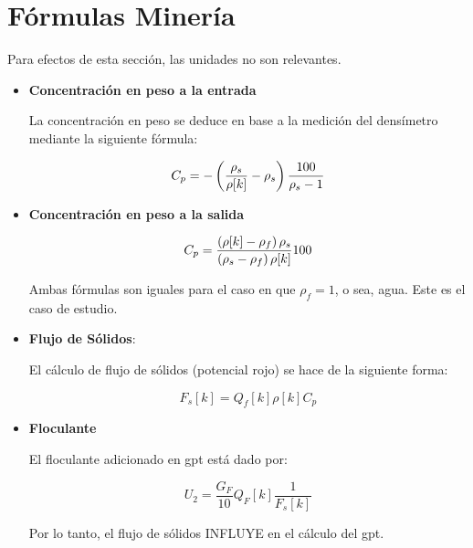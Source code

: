 \documentclass{article}
\begin{document}
\section{Fórmulas Minería}
Para efectos de esta sección, las unidades no son relevantes.
\begin{itemize}

\item \textbf{Concentración en peso a la entrada}

La concentración en peso se deduce en base a la medición del densímetro mediante la siguiente fórmula:

$$C_p = -\left( \frac{\rho_s}{\rho[k]}-\rho_s \right)\frac{100}{\rho_s-1}$$

\item \textbf{Concentración en peso a la salida}

$$C_p = \frac{\left( \rho[k]-\rho_f \right)\rho_s}{\left( \rho_s-\rho_f \right)\rho[k]}100$$

Ambas fórmulas son iguales para el caso en que $\rho_f = 1$, o sea, agua. Este es el caso de estudio.
\item \textbf{Flujo de Sólidos}:

El cálculo de flujo de sólidos (potencial {\color{red}rojo}) se hace de la siguiente forma:

$$F_s[k] = Q_f[k]\rho[k] C_p$$

\item \textbf{Floculante}

El floculante adicionado en gpt está dado por:

$$U_2 = \frac{G_F}{10}Q_F[k]\frac{1}{F_s[k]} $$

Por lo tanto, el flujo de sólidos INFLUYE en el cálculo del gpt.


\end{itemize}
\end{document}
